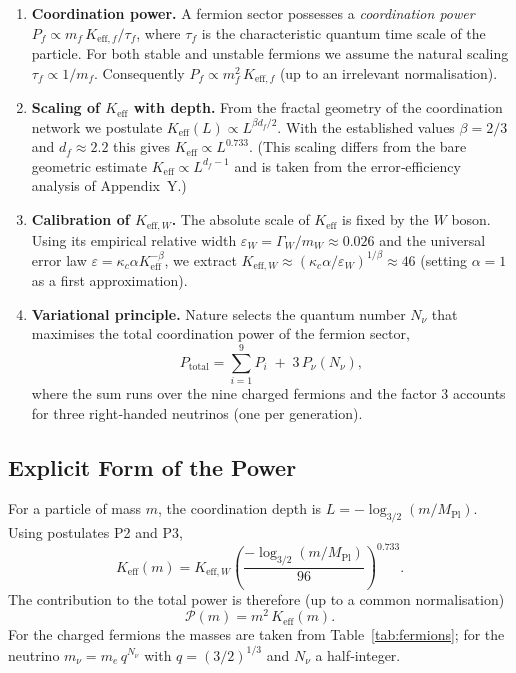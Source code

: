 \documentclass[12pt,a4paper]{article}
\begin{document}
	\begin{enumerate}[label=\textbf{P\arabic*}:, leftmargin=*]
		\item \textbf{Coordination power.} A fermion sector possesses a \emph{coordination power} 
		\(P_f \propto m_f \, K_{\mathrm{eff},f}/\tau_f\), where \(\tau_f\) is the characteristic quantum time scale of the particle.  For both stable and unstable fermions we assume the natural scaling \(\tau_f \propto 1/m_f\).  Consequently \(P_f \propto m_f^2 \, K_{\mathrm{eff},f}\) (up to an irrelevant normalisation).
		\item \textbf{Scaling of \(K_{\mathrm{eff}}\) with depth.} From the fractal geometry of the coordination network we postulate 
		\(K_{\mathrm{eff}}(L) \propto L^{\beta d_f/2}\).  With the established values \(\beta=2/3\) and \(d_f\approx2.2\) this gives \(K_{\mathrm{eff}} \propto L^{0.733}\).  (This scaling differs from the bare geometric estimate \(K_{\mathrm{eff}}\propto L^{d_f-1}\) and is taken from the error‑efficiency analysis of Appendix~Y.)
		\item \textbf{Calibration of \(K_{\mathrm{eff},W}\).}  The absolute scale of \(K_{\mathrm{eff}}\) is fixed by the \(W\) boson.  Using its empirical relative width \(\varepsilon_W = \Gamma_W/m_W \approx 0.026\) and the universal error law \(\varepsilon = \kappa_c \alpha K_{\mathrm{eff}}^{-\beta}\), we extract 
		\(K_{\mathrm{eff},W} \approx (\kappa_c \alpha / \varepsilon_W)^{1/\beta} \approx 46\) (setting \(\alpha=1\) as a first approximation).
		\item \textbf{Variational principle.}  Nature selects the quantum number \(N_{\nu}\) that maximises the total coordination power of the fermion sector,
		\begin{equation}
			P_{\mathrm{total}} = \sum_{i=1}^{9} P_i \;+\; 3\,P_{\nu}(N_{\nu}),
		\end{equation}
		where the sum runs over the nine charged fermions and the factor \(3\) accounts for three right‑handed neutrinos (one per generation).
	\end{enumerate}
	
	\subsection{Explicit Form of the Power}
	
	For a particle of mass \(m\), the coordination depth is 
	\(L = -\log_{3/2}(m/M_{\mathrm{Pl}})\).  Using postulates P2 and P3,
	\begin{equation}
		K_{\mathrm{eff}}(m) = K_{\mathrm{eff},W} \left( \frac{-\log_{3/2}(m/M_{\mathrm{Pl}})}{96} \right)^{0.733}.
	\end{equation}
	The contribution to the total power is therefore (up to a common normalisation)
	\begin{equation}
		\mathcal{P}(m) = m^2 \, K_{\mathrm{eff}}(m).
	\end{equation}
	For the charged fermions the masses are taken from Table~\ref{tab:fermions}; for the neutrino \(m_{\nu} = m_e \, q^{N_{\nu}}\) with \(q=(3/2)^{1/3}\) and \(N_{\nu}\) a half‑integer.
	
\end{document}

